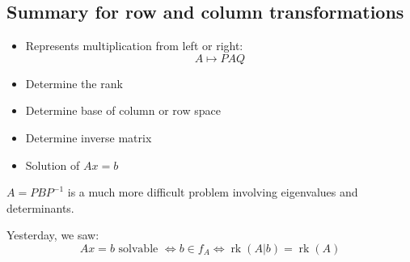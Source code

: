 \documentclass[a4paper,landscape,twocolumn]{article}
\begin{document}
\subsection{Summary for row and column transformations}
\begin{itemize}
  \item Represents multiplication from left or right:
    \[ A \mapsto P A Q \]
  \item Determine the rank
  \item Determine base of column or row space
  \item Determine inverse matrix
  \item Solution of $Ax = b$
\end{itemize}

$A = P B P^{-1}$ is a much more difficult problem involving eigenvalues and determinants.

Yesterday, we saw:
\[
  Ax = b \text{ solvable }
  \Leftrightarrow b \in f_A
  \Leftrightarrow \operatorname{rk}(A | b) = \operatorname{rk}(A)
\]
\end{document}
